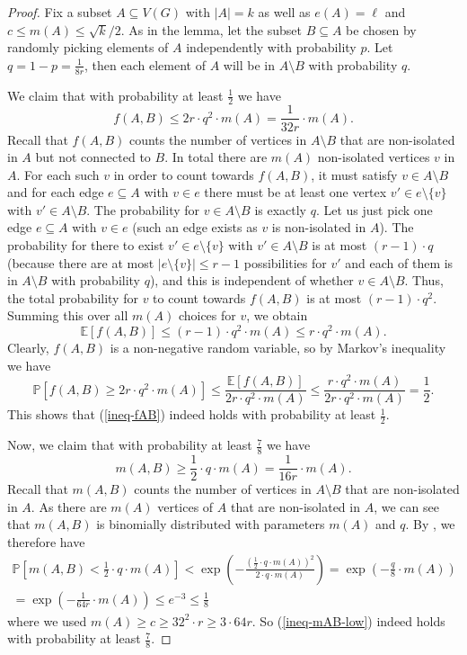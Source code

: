 \begin{proof}Fix a subset $A\subseteq V(G)$ with $\vert A\vert=k$ as well as $e(A)=\ell$ and $c\leq m(A)\leq \sqrt{k}/2$. As in the lemma, let the subset $B\subseteq A$ be chosen by randomly picking elements of $A$ independently with probability $p$. Let $q=1-p=\frac{1}{8r}$, then each element of $A$ will be in $A\setminus B$ with probability $q$.

We claim that with probability at least $\frac{1}{2}$ we have
\begin{equation}\label{ineq-fAB}
f(A,B)\leq 2r\cdot q^2 \cdot m(A)=\frac{1}{32r}\cdot m(A).
\end{equation}
Recall that $f(A,B)$ counts the number of vertices in $A\setminus B$ that are non-isolated in $A$ but not connected to $B$. In total there are $m(A)$ non-isolated vertices $v$ in $A$. For each such $v$ in order to count towards $f(A,B)$, it must satisfy $v\in A\setminus B$ and for each edge $e\subseteq A$ with $v\in e$ there must be at least one vertex $v'\in e\setminus \lbrace v\rbrace$ with $v'\in A\setminus B$. The probability for $v\in A\setminus B$ is exactly $q$. Let us just pick one edge $e\subseteq A$ with $v\in e$ (such an edge exists as $v$ is non-isolated in $A$). The probability for there to exist $v'\in e\setminus \lbrace v\rbrace$ with $v'\in A\setminus B$ is at most $(r-1)\cdot q$ (because there are at most $\vert e\setminus \lbrace v\rbrace\vert\leq r-1$ possibilities for $v'$ and each of them is in $A\setminus B$ with probability $q$), and this is independent of whether $v\in A\setminus B$. Thus, the total probability for $v$ to count towards $f(A,B)$ is at most $(r-1)\cdot q^2$. Summing this over all $m(A)$ choices for $v$, we obtain
\[\mathbb{E}[f(A,B)]\leq (r-1)\cdot q^2\cdot m(A)\leq r\cdot q^2\cdot m(A).\]
Clearly, $f(A,B)$ is a non-negative random variable, so by Markov's inequality we have
\[\mathbb{P}[f(A,B)\geq 2r\cdot q^2\cdot m(A)]\leq \frac{\mathbb{E}[f(A,B)]}{2r\cdot q^2\cdot m(A)}\leq \frac{r\cdot q^2\cdot m(A)}{2r\cdot q^2\cdot m(A)}=\frac{1}{2}.\]
This shows that (\ref{ineq-fAB}) indeed holds with probability at least $\frac{1}{2}$.

Now, we claim that with probability at least $\frac{7}{8}$ we have
\begin{equation}\label{ineq-mAB-low}
m(A,B)\geq \frac{1}{2}\cdot q \cdot m(A)=\frac{1}{16r}\cdot m(A).
\end{equation}
Recall that $m(A,B)$ counts the number of vertices in $A\setminus B$ that are non-isolated in $A$. As there are $m(A)$ vertices of $A$ that are non-isolated in $A$, we can see that $m(A,B)$ is binomially distributed with parameters $m(A)$ and $q$. By \cite[Theorem A.1.13]{alon-spencer}, we therefore have 
\begin{multline*}
\mathbb{P}\left[m(A,B)< \frac{1}{2}\cdot q \cdot m(A)\right]<\exp\left(-\frac{\left(\frac{1}{2}\cdot q \cdot m(A)\right)^2}{2\cdot q\cdot m(A)}\right)=\exp\left(-\frac{q}{8}\cdot m(A)\right)\\
=\exp\left(-\frac{1}{64r}\cdot m(A)\right)\leq e^{-3}\leq \frac{1}{8}
\end{multline*}
where we used $m(A)\geq c\geq 32^2\cdot r\geq3\cdot  64r$. So (\ref{ineq-mAB-low}) indeed holds with probability at least $\frac{7}{8}$.


\end{proof}
